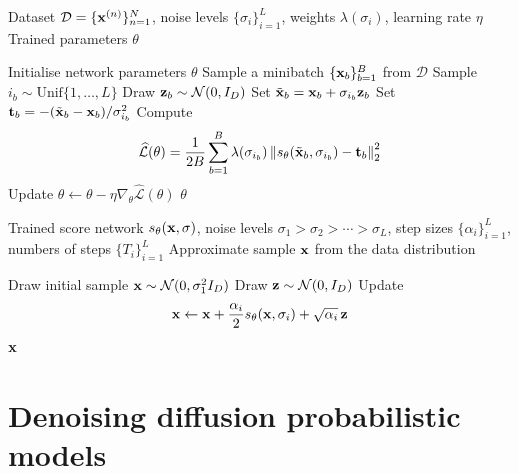 \begin{algorithm}[H]
\caption{Training a noise-conditional score network (NCSN)}
\label{alg:ncsn_training}
\begin{algorithmic}[1]
\Require Dataset \(\mathcal D=\{{ \mathbf{x}}^{(n)}\}_{n=1}^N\), noise levels \(\{\sigma_i\}_{i=1}^L\), weights \(\lambda(\sigma_i)\), learning rate \(\eta\)
\Ensure Trained parameters \(\theta\)

\State Initialise network parameters \(\theta\)
    \State Sample a minibatch \(\{{ \mathbf{x}}_b\}_{b=1}^B\) from \(\mathcal D\)
        \State Sample \(i_b \sim \mathrm{Unif}\{1,\ldots,L\}\)
        \State Draw \({ \mathbf{z}}_b \sim \mathcal N(0,I_D)\)
        \State Set \(\tilde{{ \mathbf{x}}}_b = { \mathbf{x}}_b + \sigma_{i_b}{ \mathbf{z}}_b\)
        \State Set \({\mathbf t}_b = -(\tilde{{ \mathbf{x}}}_b-{ \mathbf{x}}_b)/\sigma_{i_b}^2\)
    \EndFor
    \State Compute
    \[
    \widehat{\mathcal L}(\theta)
    =
    \frac{1}{2B}
    \sum_{b=1}^B
    \lambda(\sigma_{i_b})
    \left\|
    s_\theta(\tilde{{ \mathbf{x}}}_b,\sigma_{i_b})-{\mathbf t}_b
    \right\|_2^2
    \]
    \State Update \(\theta \leftarrow \theta - \eta \nabla_\theta \widehat{\mathcal L}(\theta)\)
\EndWhile
\State \Return \(\theta\)

\end{algorithmic}
\end{algorithm}

\begin{algorithm}[H]
\caption{Annealed Langevin dynamics sampling with a trained NCSN}
\label{alg:ald_sampling}
\begin{algorithmic}[1]
\Require Trained score network \(s_\theta({ \mathbf{x}},\sigma)\), noise levels \(\sigma_1>\sigma_2>\cdots>\sigma_L\), step sizes \(\{\alpha_i\}_{i=1}^L\), numbers of steps \(\{T_i\}_{i=1}^L\)
\Ensure Approximate sample \({ \mathbf{x}}\) from the data distribution

\State Draw initial sample \({ \mathbf{x}} \sim \mathcal N(0,\sigma_1^2 I_D)\)
        \State Draw \({ \mathbf{z}} \sim \mathcal N(0,I_D)\)
        \State Update
        \[
        { \mathbf{x}} \leftarrow { \mathbf{x}} + \frac{\alpha_i}{2}s_\theta({ \mathbf{x}},\sigma_i) + \sqrt{\alpha_i}\,{ \mathbf{z}}
        \]
    \EndFor
\EndFor
\State \Return \({ \mathbf{x}}\)

\end{algorithmic}
\end{algorithm}



\section{Denoising diffusion probabilistic models}



